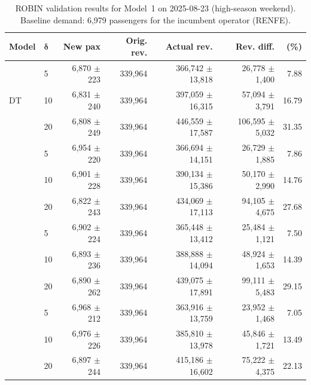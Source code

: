\begin{table}[!h]
    \centering
    \caption{ROBIN validation results for Model~1 on 2025-08-23 (high-season weekend). Baseline demand: 6,979 passengers for the incumbent operator (RENFE).}
    \label{tab:model1_validation_2025_08_23}
    \scriptsize
    \setlength{\tabcolsep}{3pt}
    \begin{tabular}{llrrrrr}
        \toprule
        \textbf{Model}
        & \(\boldsymbol{\delta}\)
        & \textbf{New pax}
        & \textbf{Orig. rev.}
        & \textbf{Actual rev.}
        & \textbf{Rev. diff.}
        & \textbf{(\%)} \\
        \midrule
        \multirow{3}{*}{DT} & 5 & 6,870 $\pm$ 223 & 339,964 & 366,742 $\pm$ 13,818 & 26,778 $\pm$ 1,400 & 7.88 \\
         & 10 & 6,831 $\pm$ 240 & 339,964 & 397,059 $\pm$ 16,315 & 57,094 $\pm$ 3,791 & 16.79 \\
         & 20 & 6,808 $\pm$ 249 & 339,964 & 446,559 $\pm$ 17,587 & 106,595 $\pm$ 5,032 & 31.35 \\
        \addlinespace
        \multirow{3}{*}{RF} & 5 & 6,954 $\pm$ 220 & 339,964 & 366,694 $\pm$ 14,151 & 26,729 $\pm$ 1,885 & 7.86 \\
         & 10 & 6,901 $\pm$ 228 & 339,964 & 390,134 $\pm$ 15,386 & 50,170 $\pm$ 2,990 & 14.76 \\
         & 20 & 6,822 $\pm$ 243 & 339,964 & 434,069 $\pm$ 17,113 & 94,105 $\pm$ 4,675 & 27.68 \\
        \addlinespace
        \multirow{3}{*}{GBDT} & 5 & 6,902 $\pm$ 224 & 339,964 & 365,448 $\pm$ 13,412 & 25,484 $\pm$ 1,121 & 7.50 \\
         & 10 & 6,893 $\pm$ 236 & 339,964 & 388,888 $\pm$ 14,094 & 48,924 $\pm$ 1,653 & 14.39 \\
         & 20 & 6,890 $\pm$ 262 & 339,964 & 439,075 $\pm$ 17,891 & 99,111 $\pm$ 5,483 & 29.15 \\
        \addlinespace
        \multirow{3}{*}{FFNN} & 5 & 6,968 $\pm$ 212 & 339,964 & 363,916 $\pm$ 13,759 & 23,952 $\pm$ 1,468 & 7.05 \\
         & 10 & 6,976 $\pm$ 226 & 339,964 & 385,810 $\pm$ 13,978 & 45,846 $\pm$ 1,721 & 13.49 \\
         & 20 & 6,897 $\pm$ 244 & 339,964 & 415,186 $\pm$ 16,602 & 75,222 $\pm$ 4,375 & 22.13 \\
        \bottomrule
    \end{tabular}
\end{table}